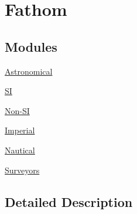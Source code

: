 \hypertarget{group___e_g_x_math-_conversions-_length_conversions-_imperial-_fathom}{}\section{Fathom}
\label{group___e_g_x_math-_conversions-_length_conversions-_imperial-_fathom}
\subsection*{Modules}
\begin{DoxyCompactItemize}
\item 
\mbox{\hyperlink{group___e_g_x_math-_conversions-_length_conversions-_imperial-_fathom-_astronomical}{Astronomical}}
\item 
\mbox{\hyperlink{group___e_g_x_math-_conversions-_length_conversions-_imperial-_fathom-_s_i}{SI}}
\item 
\mbox{\hyperlink{group___e_g_x_math-_conversions-_length_conversions-_imperial-_fathom-_non-_s_i}{Non-\/\+SI}}
\item 
\mbox{\hyperlink{group___e_g_x_math-_conversions-_length_conversions-_imperial-_fathom-_imperial}{Imperial}}
\item 
\mbox{\hyperlink{group___e_g_x_math-_conversions-_length_conversions-_imperial-_fathom-_nautical}{Nautical}}
\item 
\mbox{\hyperlink{group___e_g_x_math-_conversions-_length_conversions-_imperial-_fathom-_surveyors}{Surveyors}}
\end{DoxyCompactItemize}


\subsection{Detailed Description}
